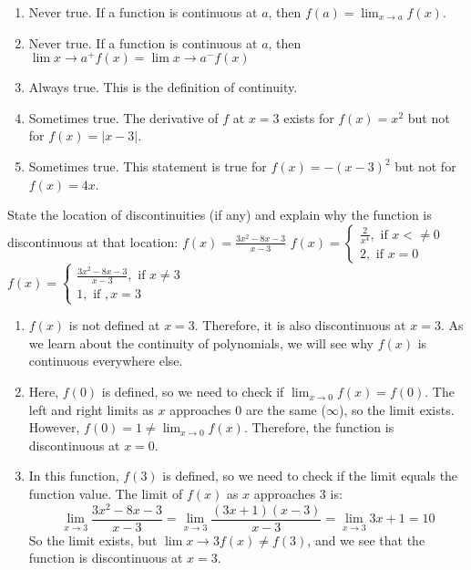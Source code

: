 \begin{Answer}[ref = continuity1]
\begin{enumerate}
\item Never true. If a function is continuous at $a$, then $f(a) = \lim_{x \to 
a} f(x)$. 
\item Never true. If a function is continuous at $a$, then $\lim{x \to a^+} 
f(x) = \lim{x \to a^-} f(x)$
\item Always true. This is the definition of continuity.
\item Sometimes true. The derivative of $f$ at $x = 3$ exists for $f(x) = x^2$ 
but not for $f(x) = |x - 3|$.
\item Sometimes true. This statement is true for $f(x) = -(x - 3)^2$ but not 
for $f(x) = 4x$.
\end{enumerate}
\end{Answer}

\begin{Exercise}[title=Limits Practice 5, label=limits5]
State the location of discontinuities (if any) and explain why the function is 
discontinuous at that location:
    \Question $f(x) = \frac{3x^2-8x-3}{x-3}$
    \Question $f(x) = \begin{cases}
    \frac{2}{x^4}, \text{ if } x <\neq 0\\
    2, \text{ if } x=0
    \end{cases}$
    \Question $f(x) = \begin{cases}
        \frac{3x^2-8x-3}{x-3}, \text{ if } x \neq 3\\
        1, \text{ if }, x=3
    \end{cases}$
\end{Exercise}

\begin{Answer}[ref=limits5]
    \begin{enumerate}
    \item $f(x)$ is not defined at $x = 3$. Therefore, it is also discontinuous
     at $x = 3$. As we learn about the continuity of polynomials, we will see 
     why $f(x)$ is continuous everywhere else. 
    \item Here, $f(0)$ is defined, so we need to check if $\lim_{x \to 0}f(x) 
    = f(0)$. The left and right limits as $x$ approaches $0$ are the same 
    ($\infty$), so the limit exists. However, $f(0) = 1 \neq \lim_{x\to 0}f(x)$. 
    Therefore, the function is discontinuous at $x=0$.
    \item In this function, $f(3)$ is defined, so we need to check if the limit 
    equals the function value. The limit of $f(x)$ as $x$ approaches $3$ is: 
    $$\lim_{x \to 3}\frac{3x^2-8x-3}{x-3} = \lim_{x \to 3}
    \frac{(3x+1)(x-3)}{x-3} = \lim_{x \to 3}3x+1 = 10$$
    So the limit exists, but $\lim{x \to 3}f(x) \neq f(3)$, and we see that the 
    function is discontinuous at $x=3$.
	\end{enumerate}
\end{Answer}

